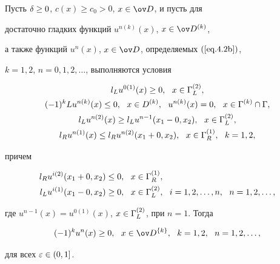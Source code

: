 \begin{lems} \label{l.4.1}


Пусть $\delta\geq 0$, $c(x)\geq c_0>0$, $x\in\od$, и пусть для


достаточно гладких функций $u^{n(k)}(x)$, $x \in \od^{(k)}$,


а также функций $u^n(x)$, $x\in\od$, определяемых $(\ref{eq.4.2b})$,


$k=1,2$, $n=0,1,2,\dotsc$, выполняются условия


\begin{gather*}


l_L u^{0(1)}(x) \geq 0,\ \ x \in \G^{(2)}_L, \\


%


(-1)^k L u^{n(k)}(x) \leq 0 ,\ \


x\in D^{(k)}, \ \ u^{n(k)}(x) = 0, \ \ x \in \G^{(k)}\cap\G,\\


%


l_L u^{n(2)}(x) \geq l_L u^{n-1}(x_1-0, x_2) ,\ \ x \in


\G^{(2)}_L, \\


%


l_R u^{n(1)}(x) \leq l_R u^{n(2)}(x_1+0,


x_2) ,\ \ x \in \G^{(1)}_R, \ \ k=1,2,


\end{gather*}


причем


\begin{align*}


l_R u^{i(2)}(x_1+0, x_2)&\leq 0, \ \ x\in\G^{(1)}_R, \\


l_L u^{i(1)}(x_1-0, x_2)&\geq 0, \ \ x\in\G^{(2)}_L,


\ \ i=1,2,\dotsc,n, \ \ n=1,2,\dotsc,


\end{align*}


где $u^{n-1}(x) = u^{0(1)}(x)$, $x\in \Gamma^{(2)}_L$, при $n=1$. Тогда


$$


(-1)^k u^{n}(x)\geq 0, \ \ x \in \od^{\{k\}}, \ \ k=1,2,


\ \ n=1,2,\dotsc,


$$


для всех $\varepsilon\in (0,1]$.


\end{lems}





